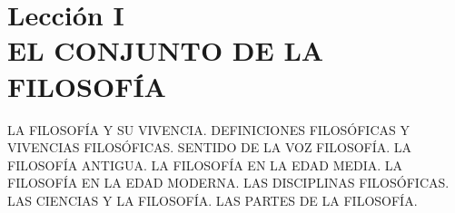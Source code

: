 \documentclass[10pt,letterpaper]{book}
\author{Manuel García Morente}
\begin{document}
\chapter*{Lecci\'{o}n I\\EL CONJUNTO DE LA FILOSOF\'{I}A}
LA FILOSOFÍA Y SU VIVENCIA. DEFINICIONES FILOSÓFICAS Y VIVENCIAS FILOSÓFICAS. SENTIDO DE LA VOZ FILOSOFÍA. LA FILOSOFÍA ANTIGUA. LA FILOSOFÍA EN LA EDAD ME­DIA. LA FILOSOFÍA EN LA EDAD MODERNA. LAS DISCIPLI­NAS FILOSÓFICAS. LAS CIENCIAS Y LA FILOSOFÍA. LAS PAR­TES DE LA FILOSOFÍA.
\end{document}
